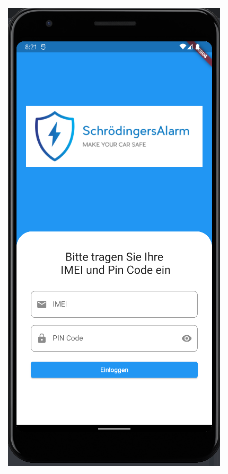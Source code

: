  \begin{figure}[t]
            \centering
            \includegraphics[width=0.5\textwidth]{Bilder/LoginIn.PNG}
    \end{figure}

